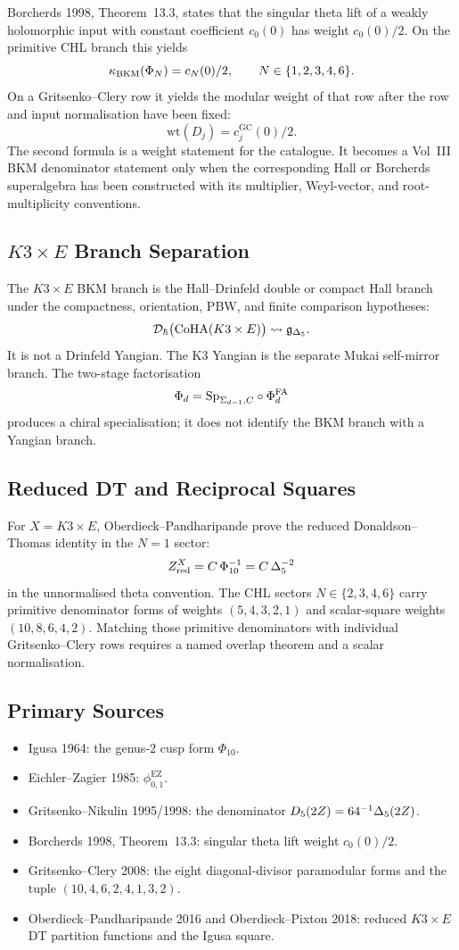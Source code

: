 Borcherds 1998, Theorem~13.3, states that the singular theta lift of a
weakly holomorphic input with constant coefficient $c_0(0)$ has weight
$c_0(0)/2$. On the primitive CHL branch this yields
\[
  \kappa_{\mathrm{BKM}}(\Phi_N)=c_N(0)/2,\qquad N\in\{1,2,3,4,6\}.
\]
On a Gritsenko--Clery row it yields the modular weight of that row after
the row and input normalisation have been fixed:
\[
  \mathrm{wt}(D_j)=c^{\mathrm{GC}}_j(0)/2.
\]
The second formula is a weight statement for the catalogue. It becomes
a Vol~III BKM denominator statement only when the corresponding Hall or
Borcherds superalgebra has been constructed with its multiplier,
Weyl-vector, and root-multiplicity conventions.

\subsection*{$K3\times E$ Branch Separation}

The $K3\times E$ BKM branch is the Hall--Drinfeld double or compact Hall
branch under the compactness, orientation, PBW, and finite comparison
hypotheses:
\[
  \mathcal D_{\hbar}\bigl(\mathrm{CoHA}(K3\times E)\bigr)
  \leadsto
  \mathfrak{g}_{\Delta_5}.
\]
It is not a Drinfeld Yangian. The K3 Yangian is the separate Mukai
self-mirror branch. The two-stage factorisation
\[
  \Phi_d=\mathrm{Sp}_{\Sigma_{d-1},C}\circ\Phi^{\mathrm{FA}}_d
\]
produces a chiral specialisation; it does not identify the BKM branch
with a Yangian branch.

\subsection*{Reduced DT and Reciprocal Squares}

For $X=K3\times E$, Oberdieck--Pandharipande prove the reduced
Donaldson--Thomas identity in the $N=1$ sector:
\[
  Z^X_{\mathrm{red}}=C\,\Phi_{10}^{-1}=C\,\Delta_5^{-2}
\]
in the unnormalised theta convention. The CHL sectors
$N\in\{2,3,4,6\}$ carry primitive denominator forms of weights
$(5,4,3,2,1)$ and scalar-square weights $(10,8,6,4,2)$. Matching those
primitive denominators with individual Gritsenko--Clery rows requires a
named overlap theorem and a scalar normalisation.

\subsection*{Primary Sources}

\begin{itemize}[leftmargin=1.5em]
\item Igusa 1964: the genus-$2$ cusp form $\Phi_{10}$.
\item Eichler--Zagier 1985: $\phi_{0,1}^{\mathrm{EZ}}$.
\item Gritsenko--Nikulin 1995/1998: the denominator
  $D_5(2Z)=64^{-1}\Delta_5(2Z)$.
\item Borcherds 1998, Theorem~13.3: singular theta lift weight
  $c_0(0)/2$.
\item Gritsenko--Clery 2008: the eight diagonal-divisor paramodular
  forms and the tuple $(10,4,6,2,4,1,3,2)$.
\item Oberdieck--Pandharipande 2016 and Oberdieck--Pixton 2018:
  reduced $K3\times E$ DT partition functions and the Igusa square.
\end{itemize}
